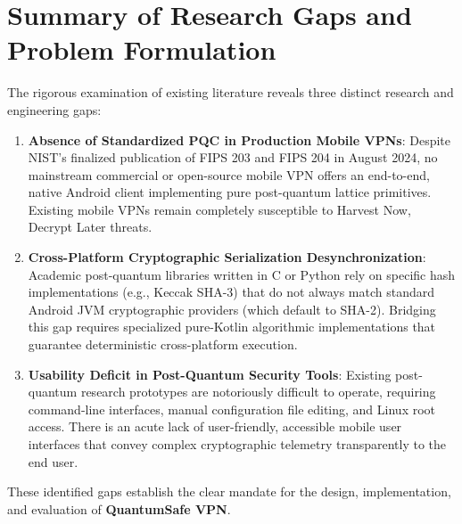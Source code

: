 \section{Summary of Research Gaps and Problem Formulation}
\label{sec:research_gaps}

The rigorous examination of existing literature reveals three distinct research and engineering gaps:
\begin{enumerate}
    \item \textbf{Absence of Standardized PQC in Production Mobile VPNs}: Despite NIST's finalized publication of FIPS 203 and FIPS 204 in August 2024, no mainstream commercial or open-source mobile VPN offers an end-to-end, native Android client implementing pure post-quantum lattice primitives. Existing mobile VPNs remain completely susceptible to Harvest Now, Decrypt Later threats.
    \item \textbf{Cross-Platform Cryptographic Serialization Desynchronization}: Academic post-quantum libraries written in C or Python rely on specific hash implementations (e.g., Keccak SHA-3) that do not always match standard Android JVM cryptographic providers (which default to SHA-2). Bridging this gap requires specialized pure-Kotlin algorithmic implementations that guarantee deterministic cross-platform execution.
    \item \textbf{Usability Deficit in Post-Quantum Security Tools}: Existing post-quantum research prototypes are notoriously difficult to operate, requiring command-line interfaces, manual configuration file editing, and Linux root access. There is an acute lack of user-friendly, accessible mobile user interfaces that convey complex cryptographic telemetry transparently to the end user.
\end{enumerate}

These identified gaps establish the clear mandate for the design, implementation, and evaluation of \textbf{QuantumSafe VPN}.
